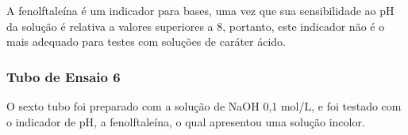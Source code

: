 		\indent A fenolftaleína é um indicador para bases, uma vez que sua sensibilidade ao pH da solução é relativa a valores superiores a 8, portanto, este indicador não é o mais adequado para testes com soluções de caráter ácido.
		
	\newpage
	\subsubsection{Tubo de Ensaio 6}

        \indent O sexto tubo foi preparado com a solução de NaOH 0,1 mol/L, e foi testado com o indicador de pH, a fenolftaleína, o qual apresentou uma solução incolor.
        \begin{figure}[h]
            \centering
            \qquad
            \label{fig:experimento15}
        \end{figure}
    
